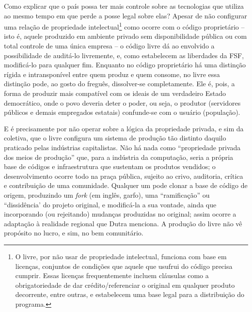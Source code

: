 Como explicar que o país possa ter mais controle sobre as tecnologias que utiliza ao mesmo tempo em que perde a posse legal sobre elas?
Apesar de não configurar uma relação de propriedade intelectual\footnote{O \swr{} livre, por não usar de propriedade intelectual, funciona com base em licenças, conjuntos de condições que aquele que usufrui do código precisa cumprir. Essas licenças frequentemente incluem cláusulas como a obrigatoriedade de dar crédito/referenciar o original em qualquer produto decorrente, entre outras, e estabelecem uma base legal para a distribuição do programa.} como ocorre com o código proprietário -- isto é, aquele produzido em ambiente privado sem disponibilidade pública ou com total controle de uma única empresa -- o código livre dá ao envolvido a possibilidade de auditá-lo livremente, e, como estabelecem as liberdades da FSF, modificá-lo para qualquer fim.
Enquanto no código proprietário há uma distinção rígida e intransponível entre quem produz e quem consome, no \swr{} livre essa distinção pode, ao gosto do freguês, dissolver-se completamente.
Ele é, pois, a forma de produzir \swr{} mais compatível com os ideais de um verdadeiro Estado democrático, onde o povo deveria deter o poder, ou seja, o produtor (servidores públicos e demais empregados estatais) confunde-se com o usuário (população).

E é precisamente por não operar sobre a lógica da propriedade privada, e sim da coletiva, que o \swr{} livre configura um sistema de produção tão distinto daquilo praticado pelas indústrias capitalistas.
Não há nada como ``propriedade privada dos meios de produção'' que, para a indústria da computação, seria a própria base de códigos e infraestrutura que sustentam os produtos vendidos; o desenvolvimento ocorre todo na praça pública, sujeito ao crivo, auditoria, crítica e contribuição de uma comunidade.
Qualquer um pode clonar a base de código de origem, produzindo um \textit{fork} (em inglês, garfo), uma ``ramificação'' ou ``dissidência' do projeto original, e modificá-la a sua vontade, ainda que incorporando (ou rejeitando) mudanças produzidas no original; assim ocorre a adaptação à realidade regional que Dutra menciona.
A produção do \swr{} livre não vê propósito no lucro, e sim, no bem comunitário.

